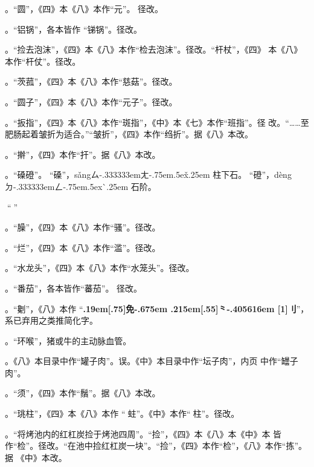 。“圆”，《四》本《八》本作“元”。
径改。

。“铝锅”，各本皆作
“锑锅”。径改。

。“捡去泡沫”，《四》本《八》本作“检去泡沫”。径改。“杆杖”，《四》
本《八》本作“杆仗”。径改。

。“茨菰”，《四》本《八》本作“慈菇”。径改。

。“圆子”，《四》本《八》本作“元子”。径改。

。“扳指”，《四》本《八》本作“斑指”，《中》本《七》本作“班指”。径
改。“……至肥肠起着皱折为适合。”“皱折”，《四》本作“绉折”。据《八》本改。

。“擀”，《四》本作“扞”。据《八》本改。

。“磉磴”。
“磉”，{s\v{a}ng}{ㄙ\kern-.333333emㄤ\kern-.75em\raise.5ex\hbox{\v{}}\kern.25em}
柱下石。
“磴”，{d\`{e}ng}{ㄉ\kern-.333333emㄥ\kern-.75em\raise.5ex\hbox{\`{}}\kern.25em}
石阶。

。“𠟤”，疑误。

。“臊”，《四》本《八》本作“骚”。径改。

。“烂”，《四》本《八》本作“滥”。径改。

。“水龙头”，《四》本《八》本作“水笼头”。径改。

。“番茄”，各本皆作“蕃茄”。
径改。

。“劖”，《八》本作
“{\bfseries\raise.19em\hbox{\scalebox{.675}[.75]{免}}\kern-.675em%
\lower.215em\hbox{\scalebox{.95}[.55]{⺀}}\kern-.405616em%
\scalebox{.65}[1]{刂}}”，系已弃用之类推简化字。

。“环喉”，猪或牛的主动脉血管。

。《八》本目录中作“罐子肉”。误。《中》本目录中作“坛子肉”，内页
中作“罎子肉”。

。“须”，《四》本作“鬚”。据《八》本改。

。“珧柱”，《四》本《八》本作
“𧎼蛀”。《中》本作“𧎼柱”。径改。

。“将烤池内的红杠炭捡于烤池四周”。“捡”，《四》本《八》本《中》本
皆作“检”。径改。“在池中捡红杠炭一块”。“捡”，《四》本作“检”，《八》本作“拣”。据
《中》本改。

